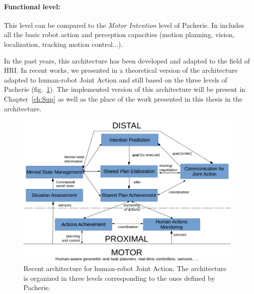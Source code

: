 \documentclass[english,a4paper,11pt,twoside]{StyleThese}
\begin{document}
\paragraph{Functional level:}
This level can be compared to the \textit{Motor Intention} level of Pacherie. In includes all the basic robot action and perception capacities (motion planning, vision, localization, tracking motion control...). 

\bigskip
In the past years, this architecture has been developed and adapted to the field of HRI. In recent works, we presented in \cite{devin2016some} a theoretical version of the architecture adapted to human-robot Joint Action and still based on the three levels of Pacherie (fig.~\ref{fig:ArchiThreeLevels}). The implemented version of this architecture will be present in Chapter~\ref{ch:Sup} as well as the place of the work presented in this thesis in the architecture.

\begin{figure}[!h]
	\centering
    \includegraphics[width=\textwidth]{figs/Chapter1/architecture.png}
    \caption{Recent architecture for human-robot Joint Action. The architecture is organized in three levels corresponding to the ones defined by Pacherie.}
    \label{fig:ArchiThreeLevels}
\end{figure}
\end{document}
